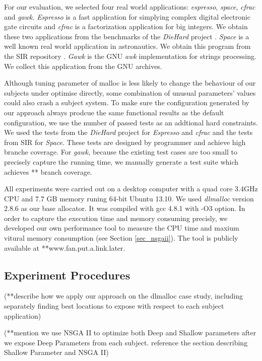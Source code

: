 For our evaluation, we selected four real world applications: \emph{espresso}, \emph{space}, \emph{cfrac} and \emph{gawk}. \emph{Espresso} is a fast application for simplying complex digital electronic gate circuits and \emph{cfrac} is a factorization application for big integers. We obtain these two applications from the benchmarks of the \emph{DieHard} project \cite{Berger:2006:DPM:1133255.1134000}. \emph{Space} is a well known real world application in astronautics. We obtain this program from the SIR repository \cite{SIR2005}. \emph{Gawk} is the GNU \emph{awk} implementation for strings processing. We collect this application from the GNU archives.

Although tuning parameter of malloc is less likely to change the behaviour of our subjects under optimise directly, some combination of unusual parameters' values could also crash a subject system. To make sure the configuration generated by our approach always prodcue the same functional results as the default configuration, we use the number of passed tests as an addtional hard constraints. We used the tests from the \emph{DieHard} project for \emph{Espresso} and \emph{cfrac} and the tests from SIR for \emph{Space}. These tests are designed by programmer and achieve high branche coverage. For \emph{gawk}, because the existing test cases are too small to precisely capture the running time, we manually generate a test suite which achieves ** branch coverage.

All experiments were carried out on a desktop computer with a quad core 3.4GHz CPU and 7.7 GB memory runing 64-bit Ubuntu 13.10. We used \emph{dlmalloc} version 2.8.6 as our base allocator. It was compiled with gcc 4.8.1 with -O3 option. In order to capture the execution time and memory consuming precisly, we developed our own performance tool to measure the CPU time and maxium vitural memory consumption (see Section \ref{sec_nsgaii}). The tool is publicly available at **www.fan.put.a.link.later.

\subsection{Experiment Procedures}

(**describe how we apply our approach on the dlmalloc case study, including separately finding best locations to expose with respect to each subject application)


(**mention we use NSGA II to optimize both Deep and Shallow parameters after we expose Deep Parameters from each subject. reference the section describing Shallow Parameter and NSGA II)
